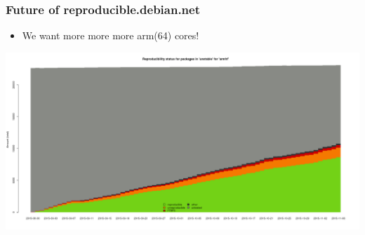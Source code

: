 \documentclass[14pt,aspectratio=169]{beamer}
\begin{document}
\begin{frame}
 \frametitle{Future of reproducible.debian.net}

 \begin{itemize}
 \item We want more more more arm(64) cores!
 \end{itemize}
 \begin{center}
  \includegraphics[height=0.73\paperheight]{images/stats_pkg_state_armhf.png}
  \vfill
 \end{center}
\end{frame}
\end{document}

